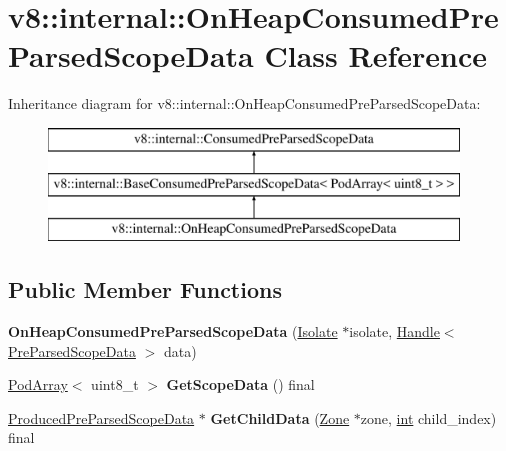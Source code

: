 \hypertarget{classv8_1_1internal_1_1OnHeapConsumedPreParsedScopeData}{}\section{v8\+:\+:internal\+:\+:On\+Heap\+Consumed\+Pre\+Parsed\+Scope\+Data Class Reference}
\label{classv8_1_1internal_1_1OnHeapConsumedPreParsedScopeData}
Inheritance diagram for v8\+:\+:internal\+:\+:On\+Heap\+Consumed\+Pre\+Parsed\+Scope\+Data\+:\begin{figure}[H]
\begin{center}
\leavevmode
\includegraphics[height=3.000000cm]{classv8_1_1internal_1_1OnHeapConsumedPreParsedScopeData}
\end{center}
\end{figure}
\subsection*{Public Member Functions}
\begin{DoxyCompactItemize}
\item 
\mbox{\label{classv8_1_1internal_1_1OnHeapConsumedPreParsedScopeData_a6a59928debdcf0901574dfb3f2a90430}} 
{\bfseries On\+Heap\+Consumed\+Pre\+Parsed\+Scope\+Data} (\mbox{\hyperlink{classv8_1_1internal_1_1Isolate}{Isolate}} $\ast$isolate, \mbox{\hyperlink{classv8_1_1internal_1_1Handle}{Handle}}$<$ \mbox{\hyperlink{classv8_1_1internal_1_1PreParsedScopeData}{Pre\+Parsed\+Scope\+Data}} $>$ data)
\item 
\mbox{\label{classv8_1_1internal_1_1OnHeapConsumedPreParsedScopeData_a068dfba9fd368f2612149d950992486a}} 
\mbox{\hyperlink{classv8_1_1internal_1_1PodArray}{Pod\+Array}}$<$ uint8\+\_\+t $>$ {\bfseries Get\+Scope\+Data} () final
\item 
\mbox{\label{classv8_1_1internal_1_1OnHeapConsumedPreParsedScopeData_a3b255ead0546f17fa8deb90fa2f84d18}} 
\mbox{\hyperlink{classv8_1_1internal_1_1ProducedPreParsedScopeData}{Produced\+Pre\+Parsed\+Scope\+Data}} $\ast$ {\bfseries Get\+Child\+Data} (\mbox{\hyperlink{classv8_1_1internal_1_1Zone}{Zone}} $\ast$zone, \mbox{\hyperlink{classint}{int}} child\+\_\+index) final
\end{DoxyCompactItemize}
